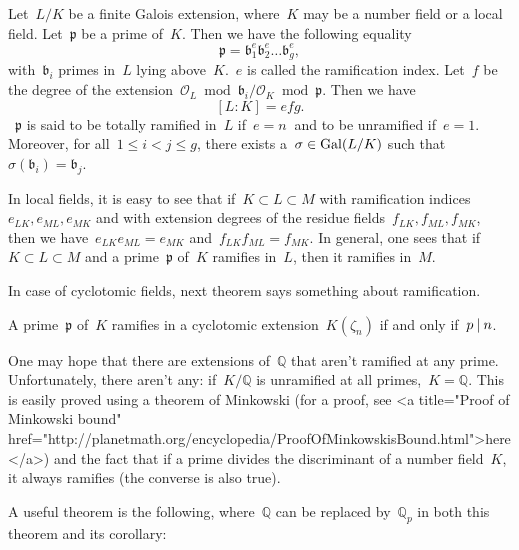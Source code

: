 \begin{proposition}
  Let~$L/K$ be a finite Galois extension, where~$K$ may be a number field or a local field. Let~$\mathfrak{p}$ be a prime of~$K$. Then we have the following equality
  \begin{equation}
    \mathfrak{p}=\mathfrak{b}_1^e \mathfrak{b}_2^e\ldots \mathfrak{b}_g^e, 
  \end{equation}
  with~$\mathfrak{b}_i$ primes in~$L$ lying above~$K$.~$e$ is called the ramification index. Let~$f$ be the degree of the extension~$\mathcal{O}_L \bmod \mathfrak{b}_i / \mathcal{O}_K \bmod \mathfrak{p}$. Then we have 
  \begin{equation}
    \left[L:K\right] = efg. 
  \end{equation}
 ~$\mathfrak{p}$ is said to be totally ramified in~$L$ if~$e =n~$ and to be unramified if~$e=1$. Moreover, for all~$1 \leq i<j \leq g$, there exists a~$\sigma \in \operatorname{Gal}(L/K)$ such that~$\sigma(\mathfrak{b}_i) = \mathfrak{b}_j$.
\end{proposition}


In local fields, it is easy to see that if~$K \subset L \subset M$ with ramification indices~$e_{LK},e_{ML},e_{MK}$ and with extension degrees of the residue fields~$f_{LK},f_{ML},f_{MK}$, then we have~$e_{LK}e_{ML} = e_{MK}$ and~$f_{LK}f_{ML}=f_{MK}$. In general, one sees that if~$K \subset L \subset M$ and a prime~$\mathfrak{p}$ of~$K$ ramifies in~$L$, then it ramifies in~$M$.

In case of cyclotomic fields, next theorem says something about ramification.

\begin{theorem}
  A prime~$\mathfrak{p}$ of~$K$ ramifies in a cyclotomic extension~$K(\zeta_n)$ if and only if~$p\mathbin{|} n$.
\end{theorem}

One may hope that there are extensions of~$\mathbb{Q}$ that aren't ramified at any prime. Unfortunately, there aren't any: if~$K/\mathbb{Q}$ is unramified at all primes,~$K = \mathbb{Q}$. This is easily proved using a theorem of Minkowski (for a proof, see <a title="Proof of Minkowski bound" href="http://planetmath.org/encyclopedia/ProofOfMinkowskisBound.html">here</a>) and the fact that if a prime divides the discriminant of a number field~$K$, it always ramifies (the converse is also true).

A useful theorem is the following, where~$\mathbb{Q}$ can be replaced by~$\mathbb{Q}_p$ in both this theorem and its corollary:

